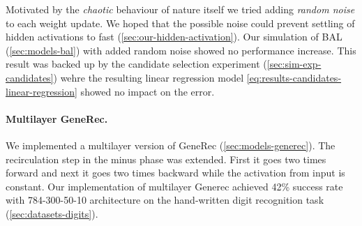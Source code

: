Motivated by the \emph{chaotic} behaviour of nature itself we tried adding \emph{random noise} to each weight update. We hoped that the possible noise could prevent settling of hidden activations to fast (\ref{sec:our-hidden-activation}). Our simulation of BAL (\ref{sec:models-bal}) with added random noise showed no performance increase. This result was backed up by the candidate selection experiment (\ref{sec:sim-exp-candidates}) wehre the resulting linear regression model \ref{eq:results-candidates-linear-regression} showed no impact on the error. 

\paragraph{Multilayer GeneRec.}

We implemented a multilayer version of GeneRec (\ref{sec:models-generec}). The recirculation step in the minus phase was extended. First it goes two times forward and next it goes two times backward while the activation from input is constant. Our implementation of multilayer Generec achieved 42\% success rate with 784-300-50-10 architecture on the hand-written digit recognition task (\ref{sec:datasets-digits}). 
